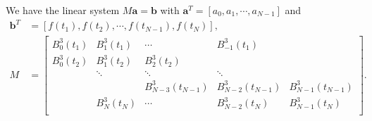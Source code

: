 \documentclass[a4paper]{article}
\theoremstyle{definition}
\begin{document}
We have the linear system $M\mathbf{a} = \mathbf{b}$ with $\mathbf{a}^T = [a_0, a_1, \cdots, a_{N - 1}]$ and
\begin{equation}
  \begin{aligned}
    \mathbf{b}^T &= [f(t_1), f(t_2), \cdots, f(t_{N - 1}), f(t_N)], \\
    M &= \begin{bmatrix}
      B_0^3(t_1) & B_1^3(t_1) &  \cdots  &  B_{-1}^3(t_1) &  \\
      B_0^3(t_2) & B_1^3(t_2) & B_2^3(t_2) &    &    \\
        &  \ddots &  \ddots & \ddots &    \\
        &    & B_{N - 3}^3(t_{N - 1}) & B_{N - 2}^3(t_{N - 1}) & B_{N - 1}^3(t_{N - 1}) \\
        & B_N^3(t_N) & \cdots &  B_{N - 2}^3(t_N) & B_{N - 1}^3(t_N) \\
    \end{bmatrix}.
  \end{aligned}
  \label{eq:periodic-cubic-b-spline-linear-system}
\end{equation}
\end{document}
